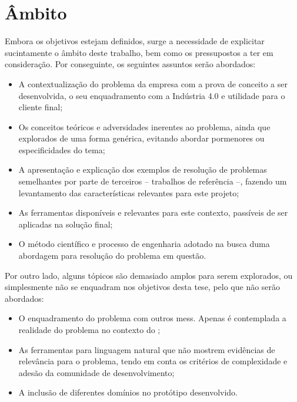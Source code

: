 \section{Âmbito}
\label{sec:chap01_scope}
Embora os objetivos estejam definidos, surge a necessidade de explicitar sucintamente o âmbito deste trabalho, bem como os pressupostos a ter em consideração. Por conseguinte, os seguintes assuntos serão abordados:

\begin{itemize}
    \item
    {
        A contextualização do problema da empresa com a prova de conceito a ser desenvolvida, o seu enquadramento com a Indústria 4.0 e utilidade para o cliente final; 
    }
    \item 
    {
        Os conceitos teóricos e adversidades inerentes ao problema, ainda que explorados de uma forma genérica, evitando abordar pormenores ou especificidades do tema;
    }
    \item
    {
        A apresentação e explicação dos exemplos de resolução de problemas semelhantes por parte de terceiros -- trabalhos de referência --, fazendo um levantamento das características relevantes para este projeto;
    }
    \item
    {
        As ferramentas disponíveis e relevantes para este contexto, passíveis de ser aplicadas na solução final;
    }
    \item
    {
        O método científico e processo de engenharia adotado na busca duma abordagem para resolução do problema em questão.
    }
\end{itemize}

Por outro lado, alguns tópicos são demasiado amplos para serem explorados, ou simplesmente não se enquadram nos objetivos desta tese, pelo que não serão abordados:

\begin{itemize}
    \item
    {
        O enquadramento do problema com outros \glspl{mes}. Apenas é contemplada a realidade do problema no contexto do {\productname};
    }
    \item
    {
        As ferramentas para linguagem natural que não mostrem evidências de relevância para o problema, tendo em conta os critérios de complexidade e adesão da comunidade de desenvolvimento;
    }
    \item 
    {
        A inclusão de diferentes domínios no protótipo desenvolvido.
    }
\end{itemize}

